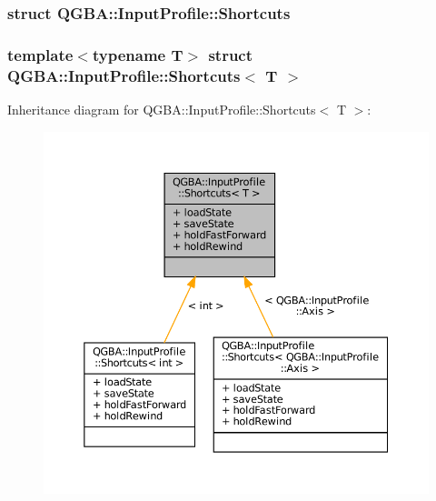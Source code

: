 \label{struct_q_g_b_a_1_1_input_profile_1_1_shortcuts}
\subsubsection{struct Q\+G\+BA\+:\+:Input\+Profile\+:\+:Shortcuts}
\subsubsection*{template$<$typename T$>$\newline
struct Q\+G\+B\+A\+::\+Input\+Profile\+::\+Shortcuts$<$ T $>$}



Inheritance diagram for Q\+G\+BA\+:\+:Input\+Profile\+:\+:Shortcuts$<$ T $>$\+:
\nopagebreak
\begin{figure}[H]
\begin{center}
\leavevmode
\includegraphics[width=350pt]{struct_q_g_b_a_1_1_input_profile_1_1_shortcuts__inherit__graph}
\end{center}
\end{figure}


